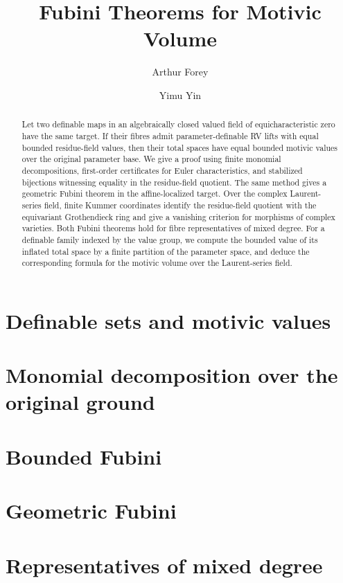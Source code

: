 \documentclass[12pt]{amsart}
\title{Fubini Theorems for Motivic Volume}
\author{Arthur Forey}
\author{Yimu Yin}
\date{}
\numberwithin{equation}{section}
\theoremstyle{definition}
\theoremstyle{remark}
\begin{document}
\maketitle
\begin{abstract}
Let two definable maps in an algebraically closed valued field of
equicharacteristic zero have the same target. If their fibres admit
parameter-definable RV lifts with equal bounded residue-field values, then
their total spaces have equal bounded motivic values over the original
parameter base. We give a proof using finite monomial decompositions,
first-order certificates for Euler characteristics, and stabilized
bijections witnessing equality in the residue-field quotient. The same
method gives a geometric Fubini theorem in the affine-localized target.
Over the complex Laurent-series field, finite Kummer coordinates identify
the residue-field quotient with the equivariant Grothendieck ring and give
a vanishing criterion for morphisms of complex varieties.
Both Fubini theorems hold for fibre representatives of mixed degree.
For a definable family indexed by the value group, we compute the bounded
value of its inflated total space by a finite partition of the parameter
space, and deduce the corresponding formula for the motivic volume over
the Laurent-series field.
\end{abstract}

\section{Definable sets and motivic values}
\label{sec:setup}

\section{Monomial decomposition over the original ground}
\label{sec:decomposition}

\section{Bounded Fubini}
\label{sec:bounded}

\section{Geometric Fubini}
\label{sec:geometric}

\section{Representatives of mixed degree}
\label{sec:mixed}

\end{document}
